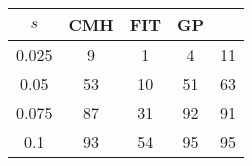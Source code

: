 \centering \begin{tabular}{c|c|c|c|c}
$s$	&CMH	&FIT	&GP	&\sc{Clear}\\\hline
0.025	&9	&1	&4	&11\\
0.05	&53	&10	&51	&63\\
0.075	&87	&31	&92	&91\\
0.1	&93	&54	&95	&95\\
\end{tabular}
